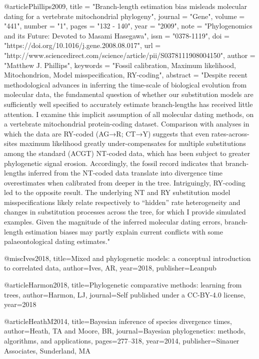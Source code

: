 
@article{Phillips2009,
title = "Branch-length estimation bias misleads molecular dating for a vertebrate mitochondrial phylogeny",
journal = "Gene",
volume = "441",
number = "1",
pages = "132 - 140",
year = "2009",
note = "Phylogenomics and its Future: Devoted to Masami Hasegawa",
issn = "0378-1119",
doi = "https://doi.org/10.1016/j.gene.2008.08.017",
url = "http://www.sciencedirect.com/science/article/pii/S0378111908004150",
author = "Matthew J. Phillips",
keywords = "Fossil calibration, Maximum likelihood, Mitochondrion, Model misspecification, RY-coding",
abstract = "Despite recent methodological advances in inferring the time-scale of biological evolution from molecular data, the fundamental question of whether our substitution models are sufficiently well specified to accurately estimate branch-lengths has received little attention. I examine this implicit assumption of all molecular dating methods, on a vertebrate mitochondrial protein-coding dataset. Comparison with analyses in which the data are RY-coded (AG→R; CT→Y) suggests that even rates-across-sites maximum likelihood greatly under-compensates for multiple substitutions among the standard (ACGT) NT-coded data, which has been subject to greater phylogenetic signal erosion. Accordingly, the fossil record indicates that branch-lengths inferred from the NT-coded data translate into divergence time overestimates when calibrated from deeper in the tree. Intriguingly, RY-coding led to the opposite result. The underlying NT and RY substitution model misspecifications likely relate respectively to “hidden” rate heterogeneity and changes in substitution processes across the tree, for which I provide simulated examples. Given the magnitude of the inferred molecular dating errors, branch-length estimation biases may partly explain current conflicts with some palaeontological dating estimates."
}


@misc{Ives2018,
  title={Mixed and phylogenetic models: a conceptual introduction to correlated data},
  author={Ives, AR},
  year={2018},
  publisher={Leanpub}
}

@article{Harmon2018,
  title={Phylogenetic comparative methods: learning from trees},
  author={Harmon, LJ},
  journal={Self published under a CC-BY-4.0 license},
  year={2018}
}

@article{HeathM2014,
  title={Bayesian inference of species divergence times},
  author={Heath, TA and Moore, BR},
  journal={Bayesian phylogenetics: methods, algorithms, and applications},
  pages={277--318},
  year={2014},
  publisher={Sinauer Associates, Sunderland, MA}
}


